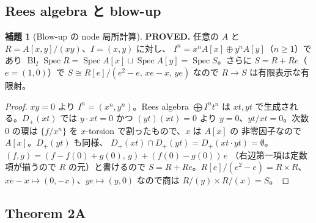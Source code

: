 \documentclass[11pt,a4paper]{article}
\numberwithin{equation}{section}
\theoremstyle{definition}
\newtheorem{lemma}[definition]{補題}
\DeclareMathOperator{\Bl}{Bl}
\begin{document}
\subsection{Rees algebra と blow-up}

\begin{lemma}[Blow-up の node 局所計算]\label{lem:rees}
\textbf{PROVED.} 任意の \(A\) と \(R=A[x,y]/(xy)\)、\(I=(x,y)\) に対し、
\(I^n=x^nA[x]\oplus y^nA[y]\)（\(n\ge1\)）であり
\(\Bl_I\operatorname{Spec}R=\operatorname{Spec}A[x]\sqcup\operatorname{Spec}A[y]
=\operatorname{Spec}S\)。さらに \(S=R+Re\)（\(e=(1,0)\)）で
\(S\cong R[e]/(e^2-e,\,xe-x,\,ye)\) なので \(R\to S\) は有限表示な有限射。
\end{lemma}

\begin{proof}
\(xy=0\) より \(I^n=(x^n,y^n)\)。Rees algebra \(\bigoplus I^nt^n\) は
\(xt,yt\) で生成される。\(D_+(xt)\) では \(y\cdot xt=0\) かつ
\((yt)(xt)=0\) より \(y=0\)、\(yt/xt=0\)。次数 \(0\) の環は
\(\{f/x^n\}\) を \(x\)-torsion で割ったもので、\(x\) は \(A[x]\) の
非零因子なので \(A[x]\)。\(D_+(yt)\) も同様、
\(D_+(xt)\cap D_+(yt)=D_+(xt\cdot yt)=\emptyset\)。
\((f,g)=(f-f(0)+g(0),\,g)+(f(0)-g(0))\,e\)
（右辺第一項は定数項が揃うので \(R\) の元）と書けるので \(S=R+Re\)。\(R[e]/(e^2-e)=R\times R\)、
\(xe-x\mapsto(0,-x)\)、\(ye\mapsto(y,0)\) なので商は \(R/(y)\times R/(x)=S\)。
\end{proof}

\subsection{Theorem 2A}
\end{document}
